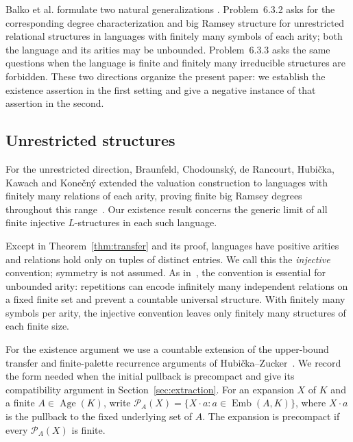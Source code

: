 \documentclass{article}
\numberwithin{equation}{section}
\theoremstyle{definition}
\DeclareMathOperator{\Emb}{Emb}
\DeclareMathOperator{\Age}{Age}
\begin{document}
Balko et al. formulate two natural generalizations
\cite[Section~6.3]{BinaryExact}. Problem~6.3.2 asks for
the corresponding degree characterization and big Ramsey structure for
unrestricted relational structures in languages with finitely many
symbols of each arity; both the language and its arities may be unbounded.
Problem~6.3.3 asks the same questions when the language is finite and
finitely many irreducible structures are forbidden. These two directions
organize the present paper: we establish the existence assertion in the
first setting and give a negative instance of that assertion in the second.

\subsection{Unrestricted structures}

For the unrestricted direction, Braunfeld, Chodounsk\'y, de Rancourt,
Hubi\v cka, Kawach and Kone\v cn\'y extended the valuation construction
to languages with finitely many relations of each arity, proving finite
big Ramsey degrees throughout this range~\cite{InfiniteLanguages}.
Our existence result concerns the generic limit of all finite injective
$L$-structures in each such language.

Except in Theorem~\ref{thm:transfer} and its proof, languages have positive
arities and relations hold only on tuples of distinct entries. We call
this the \emph{injective} convention;
symmetry is not assumed. As in~\cite{InfiniteLanguages}, the convention
is essential for unbounded arity: repetitions can encode infinitely many
independent relations on a fixed finite set and prevent a countable
universal structure. With finitely many symbols per arity, the injective
convention leaves only finitely many structures of each finite size.

For the existence argument we use a countable extension of the upper-bound
transfer and finite-palette recurrence arguments of
Hubi\v cka--Zucker~\cite[Theorem~3.10, Fact~3.4 and the proof of
Theorem~3.18]{HZ}. We record the form needed when the initial pullback is
precompact and give its compatibility argument in
Section~\ref{sec:extraction}. For an expansion $X$ of $K$ and a finite
$A\in\Age(K)$, write
$\mathcal P_A(X)=\{X\cdot a:a\in\Emb(A,K)\}$, where $X\cdot a$ is the
pullback to the fixed underlying set of $A$. The expansion is precompact
if every $\mathcal P_A(X)$ is finite.
\end{document}
